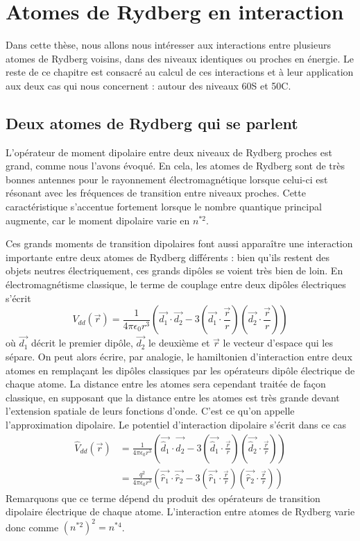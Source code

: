 \section{Atomes de Rydberg en interaction}
Dans cette thèse, nous allons nous intéresser aux interactions entre plusieurs atomes de Rydberg voisins, dans des niveaux identiques ou proches en énergie.
Le reste de ce chapitre est consacré au calcul de ces interactions et à leur application aux deux cas qui nous concernent : autour des niveaux 60S et 50C.

	\subsection{Deux atomes de Rydberg qui se parlent}
L'opérateur de moment dipolaire entre deux niveaux de Rydberg proches est grand, comme nous l'avons évoqué.
En cela, les atomes de Rydberg sont de très bonnes antennes pour le rayonnement électromagnétique lorsque celui-ci est résonant avec les fréquences de transition entre niveaux proches.
Cette caractéristique s'accentue fortement lorsque le nombre quantique principal augmente, car le moment dipolaire varie en $n^{*2}$.

Ces grands moments de transition dipolaires font aussi apparaître une interaction importante entre deux atomes de Rydberg différents : bien qu'ils restent des objets neutres électriquement, ces grands dipôles se voient très bien de loin.
En électromagnétisme classique, le terme de couplage entre deux dipôles électriques s'écrit \cite{TXT_JACKSON}
\begin{equation}\label{eq:classicDipole}
V_{dd}(\vec{r}) = \frac{1}{4\pi\epsilon_0 r^3} \left( \vec{d_1}\cdot \vec{d_2} - 3(\vec{d_1}\cdot \frac{\vec{r}}{r})(\vec{d_2}\cdot\frac{\vec{r}}{r}) \right)
\end{equation}
où $\vec{d_1}$ décrit le premier dipôle, $\vec{d_2}$ le deuxième et $\vec{r}$ le vecteur d'espace qui les sépare.
On peut alors écrire, par analogie, le hamiltonien d'interaction entre deux atomes en remplaçant les dipôles classiques par les opérateurs dipôle électrique de chaque atome.
La distance entre les atomes sera cependant traitée de façon classique, en supposant que la distance entre les atomes est très grande devant l'extension spatiale de leurs fonctions d'onde. C'est ce qu'on appelle l'approximation dipolaire.
Le potentiel d'interaction dipolaire s'écrit dans ce cas
\begin{equation}\label{eq:quantDipole}
\begin{aligned}
\hat{V}_{dd}(\vec{r}) &= \frac{1}{4\pi\epsilon_0 r^3} \left( \vec{\hat{d}_1}\cdot \vec{\hat{d}_2} - 3(\vec{\hat{d}_1}\cdot \frac{\vec{r}}{r})(\vec{\hat{d}_2}\cdot\frac{\vec{r}}{r}) \right) \\
&= \frac{q^2}{4\pi\epsilon_0 r^3} \left( \vec{\hat{r}_1}\cdot \vec{\hat{r}_2} - 3(\vec{\hat{r}_1}\cdot \frac{\vec{r}}{r})(\vec{\hat{r}_2}\cdot\frac{\vec{r}}{r}) \right)
\end{aligned}
\end{equation}
%
Remarquons que ce terme dépend du produit des opérateurs de transition dipolaire électrique de chaque atome. L'interaction entre atomes de Rydberg varie donc comme $(n^{*2})^2 = n^{*4}$.

